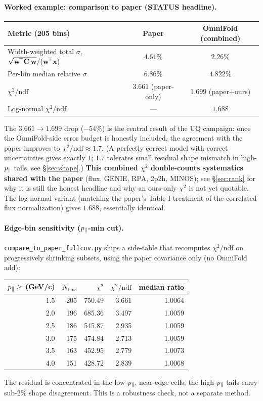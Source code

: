 \paragraph{Worked example: comparison to paper (STATUS headline).}
\begin{center}
\begin{tabular}{@{}lcc@{}}
\toprule
Metric (205 bins) & Paper & OmniFold (combined) \\
\midrule
Width-weighted total $\sigma$, $\sqrt{\mathbf{w}^{\!\top}\mathbf{C}\,\mathbf{w}}/(\mathbf{w}^{\!\top}\mathbf{x})$ & $4.61\%$ & $2.26\%$ \\
Per-bin median relative $\sigma$ & $6.86\%$ & $4.822\%$ \\
$\chi^{2}/\mathrm{ndf}$ & $3.661$ (paper-only) & $\boxed{1.699}$ (paper$+$ours) \\
Log-normal $\chi^{2}/\mathrm{ndf}$ & --- & $1.688$ \\
\bottomrule
\end{tabular}
\end{center}
The $3.661 \to 1.699$ drop ($-54\%$) is the central result of the UQ
campaign: once the OmniFold-side error budget is honestly included,
the agreement with the paper improves to $\chi^{2}/\mathrm{ndf}
\approx 1.7$. (A perfectly correct model with correct uncertainties
gives exactly $1$; $1.7$ tolerates small residual shape mismatch in
high-$p_{\parallel}$ tails, see \S\ref{sec:shape}.) \textbf{This combined
$\chi^{2}$ double-counts systematics shared with the paper} (flux,
GENIE, RPA, 2p2h, MINOS); see \S\ref{sec:rank} for why it is still the
honest headline and why an ours-only $\chi^{2}$ is not yet quotable.
The log-normal variant (matching the paper's Table I treatment of the
correlated flux normalization) gives $1.688$, essentially identical.

\paragraph{Edge-bin sensitivity ($p_{\parallel}$-min cut).}
\texttt{compare\_to\_paper\_fullcov.py} ships a side-table that
recomputes $\chi^{2}/\mathrm{ndf}$ on progressively shrinking subsets,
using the paper covariance only (no OmniFold add):
\begin{center}
\begin{tabular}{@{}rrrrr@{}}
\toprule
$p_{\parallel} \ge$ (GeV/c) & $N_{\text{bins}}$ & $\chi^{2}$ & $\chi^{2}/\mathrm{ndf}$ & median ratio \\
\midrule
1.5 & 205 & 750.49 & 3.661 & 1.0064 \\
2.0 & 196 & 685.36 & 3.497 & 1.0059 \\
2.5 & 186 & 545.87 & 2.935 & 1.0059 \\
3.0 & 175 & 474.84 & 2.713 & 1.0059 \\
3.5 & 163 & 452.95 & 2.779 & 1.0073 \\
4.0 & 151 & 428.72 & 2.839 & 1.0068 \\
\bottomrule
\end{tabular}
\end{center}
The residual is concentrated in the low-$p_{\parallel}$, near-edge cells; the
high-$p_{\parallel}$ tails carry sub-$2\%$ shape disagreement. This is a
robustness check, not a separate method.

